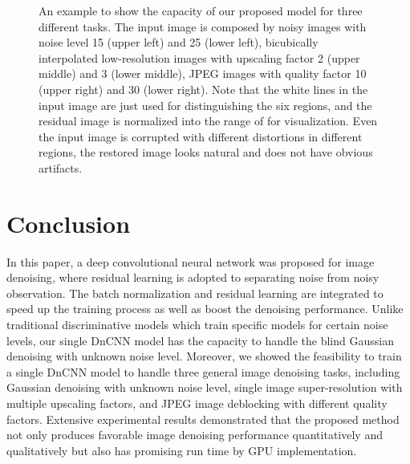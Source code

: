 \documentclass[journal]{IEEEtran}
\begin{document}
\begin{figure*}[!htbp]
\begin{center}
\caption{An example to show the capacity of our proposed model for three different tasks. The input image is composed by noisy images with noise level 15 (upper left) and 25 (lower left), bicubically interpolated low-resolution images with upscaling factor 2 (upper middle) and  3 (lower middle), JPEG images with quality factor 10 (upper right) and 30 (lower right). Note that the white lines in the input image are just used for distinguishing the six regions, and the residual image is normalized into the range of  for visualization. Even the input image is corrupted with different distortions in different regions, the restored image looks natural and does not have obvious artifacts.}\label{fig03}
\end{center}
\end{figure*}





\section{Conclusion}\label{sec:conclusion}
In this paper, a deep convolutional neural network was proposed for {image denoising}, where residual learning is adopted to separating noise from noisy observation. The batch normalization and residual learning are integrated to speed up the training process as well as boost the denoising performance. Unlike traditional discriminative models which train specific models for certain noise levels, our single DnCNN model has the capacity to handle the blind Gaussian denoising with unknown noise level. Moreover, we showed the feasibility to train a single DnCNN model to handle three general image denoising tasks, including Gaussian denoising with unknown noise level, single image super-resolution with multiple upscaling factors, and JPEG image deblocking with different quality factors. Extensive experimental results demonstrated that the proposed method not only produces favorable image denoising performance quantitatively and qualitatively but also has promising run time by GPU implementation.
\end{document}
